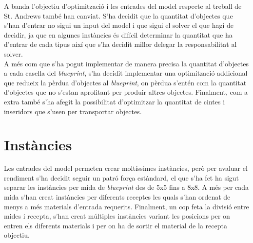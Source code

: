 A banda l'objectiu d'optimització i les entrades del model respecte al treball de St. Andrews també han canviat. S'ha decidit que la quantitat d'objectes que s'han d'entrar no sigui un input del model i que sigui el solver el que hagi de decidir, ja que en algunes instàncies és difícil determinar la quantitat que ha d'entrar de cada tipus així que s'ha decidit millor delegar la responsabilitat al solver.\\
A més com que s'ha pogut implementar de manera precisa la quantitat d'objectes a cada casella del \textit{blueprint}, s'ha decidit implementar una optimització addicional que redueix la pèrdua d'objectes al \textit{blueprint}, on pèrdua s'entén com la quantitat d'objectes que no s'estan aprofitant per produir altres objectes. Finalment, com a extra també s'ha afegit la possibilitat d'optimitzar la quantitat de cintes i inseridors que s'usen per transportar objectes.

\section{Instàncies}
Les entrades del model permeten crear moltíssimes instàncies, però per avaluar el rendiment s'ha decidit seguir un patró força estàndard, el que s'ha fet ha sigut separar les instàncies per mida de \textit{blueprint} des de 5x5 fins a 8x8. A més per cada mida s'han creat instàncies per diferents receptes les quals s'han ordenat de menys a més materials d'entrada requerits. Finalment, un cop feta la divisió entre mides i recepta, s'han creat múltiples instàncies variant les posicions per on entren els diferents materials i per on ha de sortir el material de la recepta objectiu.
